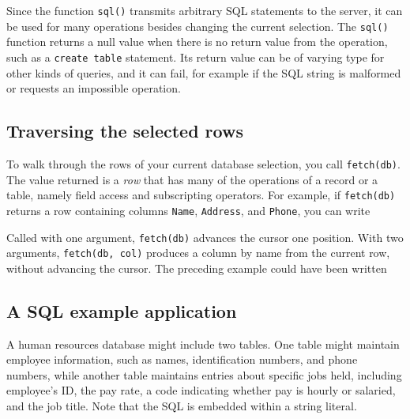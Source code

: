 Since the function \texttt{sql()} transmits arbitrary SQL statements to
the server, it can be used for many operations besides changing the
current selection. The \texttt{sql()} function returns a null value
when there is no return value from the operation, such as a
\texttt{create table} statement. Its return value can be of varying
type for other kinds of queries, and it can fail, for example if the
SQL string is malformed or requests an impossible operation.

\subsection*{Traversing the selected rows}

To walk through the rows of your current database selection, you call
\texttt{fetch(db)}. The value returned is a
\textit{row} that has many of the operations of a record or a table,
namely field access and subscripting operators. For example, if
\texttt{fetch(db)} returns a row containing columns \texttt{Name}, \texttt{Address}, and
\texttt{Phone}, you can write


\noindent
Called with one argument, \texttt{fetch(db)} advances the cursor
one position. With two arguments, \texttt{fetch(db, col)} produces a
column by name from the current row, without advancing the cursor.
The preceding example could have been written


\subsection*{A SQL example application}

A human resources database might include two tables. One
table might maintain employee information, such as names,
identification numbers, and phone numbers, while another table
maintains entries about specific jobs held, including
employee's ID, the pay rate, a code indicating whether
pay is hourly or salaried, and the job title. Note that the SQL is
embedded within a string literal.


